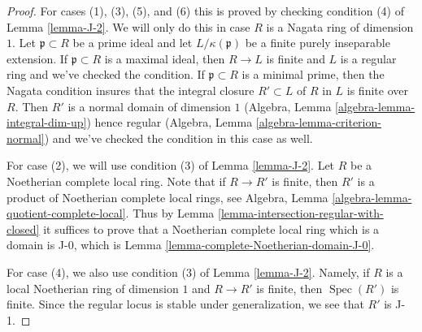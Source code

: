 \documentclass[10pt,a4paper]{amsart}
\theoremstyle{plain}
\theoremstyle{definition}
\theoremstyle{remark}
\numberwithin{equation}{subsection}
\def\Spec{\mathop{\mathrm{Spec}}}
\begin{document}
\begin{proof}
For cases (1), (3), (5), and (6) this is proved by checking
condition (4) of Lemma \ref{lemma-J-2}. We will only do this
in case $R$ is a Nagata ring of dimension $1$. Let $\mathfrak p \subset R$
be a prime ideal and let $L/\kappa(\mathfrak p)$ be a finite
purely inseparable extension. If $\mathfrak p \subset R$ is a
maximal ideal, then $R \to L$ is finite and $L$ is a regular ring
and we've checked the condition. If $\mathfrak p \subset R$ is a
minimal prime, then the Nagata condition insures that the
integral closure $R' \subset L$ of $R$ in $L$ is finite over $R$.
Then $R'$ is a normal domain of dimension $1$
(Algebra, Lemma \ref{algebra-lemma-integral-dim-up})
hence regular (Algebra, Lemma \ref{algebra-lemma-criterion-normal})
and we've checked the condition in this case as well.

\medskip\noindent
For case (2), we will use condition (3) of Lemma \ref{lemma-J-2}.
Let $R$ be a Noetherian complete local ring.
Note that if $R \to R'$ is finite, then $R'$ is a product of
Noetherian complete local rings, see
Algebra, Lemma \ref{algebra-lemma-quotient-complete-local}.
Thus by Lemma \ref{lemma-intersection-regular-with-closed} it
suffices to prove that a Noetherian complete local ring
which is a domain is J-0, which is
Lemma \ref{lemma-complete-Noetherian-domain-J-0}.

\medskip\noindent
For case (4), we also use condition (3) of Lemma \ref{lemma-J-2}.
Namely, if $R$ is a local Noetherian ring of dimension $1$ and
$R \to R'$ is finite, then $\Spec(R')$ is finite. Since the
regular locus is stable under generalization, we see
that $R'$ is J-1.
\end{proof}
\end{document}
